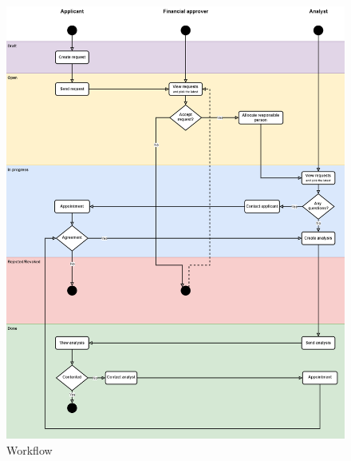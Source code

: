\begin{figure}[H]
    \centering
    \includegraphics[scale=.4]{media/Workflow}
    \caption{Workflow}
    \label{fig:Workflow}
\end{figure}
\newpage
